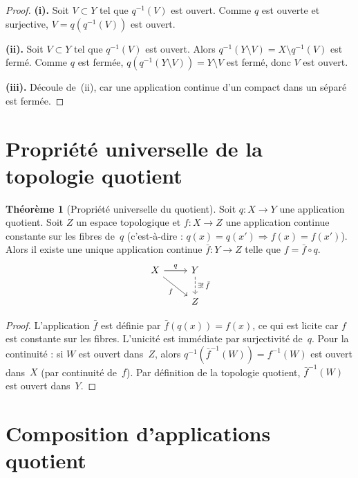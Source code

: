 \documentclass[12pt,a4paper,openany]{book}
\theoremstyle{definition}
\theoremstyle{cours}
\newtheorem{theoreme}{Théorème}[chapter]
\theoremstyle{coursnormal}
\begin{document}
\begin{proof}
\noindent\textbf{(i).} Soit $V \subset Y$ tel que $q^{-1}(V)$ est ouvert. Comme $q$ est
ouverte et surjective, $V = q(q^{-1}(V))$ est ouvert.

\noindent\textbf{(ii).} Soit $V \subset Y$ tel que $q^{-1}(V)$ est ouvert. Alors
$q^{-1}(Y \setminus V) = X \setminus q^{-1}(V)$ est fermé. Comme $q$ est fermée,
$q(q^{-1}(Y \setminus V)) = Y \setminus V$ est fermé, donc $V$ est ouvert.

\noindent\textbf{(iii).} Découle de~(ii), car une application continue d'un
compact dans un séparé est fermée.
\end{proof}

\section{Propriété universelle de la topologie quotient}
\label{sec:propriete-universelle-quotient}

\begin{theoreme}[Propriété universelle du quotient]
\label{thm:universelle-quotient}
Soit $q \colon X \to Y$ une application quotient. Soit $Z$ un espace topologique
et $f \colon X \to Z$ une application continue constante sur les fibres de~$q$
(c'est-à-dire : $q(x) = q(x') \Rightarrow f(x) = f(x')$). Alors il existe une unique
application continue $\bar{f} \colon Y \to Z$ telle que $f = \bar{f} \circ q$.
\[
\begin{tikzcd}
  X \arrow[r, "q"] \arrow[dr, "f"'] & Y \arrow[d, dashed, "\exists!\, \bar{f}"] \\
  & Z
\end{tikzcd}
\]
\end{theoreme}

\begin{proof}
L'application $\bar{f}$ est définie par $\bar{f}(q(x)) = f(x)$, ce qui est licite
car $f$ est constante sur les fibres. L'unicité est immédiate par surjectivité de~$q$.
Pour la continuité : si $W$ est ouvert dans~$Z$, alors
$q^{-1}(\bar{f}^{-1}(W)) = f^{-1}(W)$ est ouvert dans~$X$ (par continuité de~$f$).
Par définition de la topologie quotient, $\bar{f}^{-1}(W)$ est ouvert dans~$Y$.
\end{proof}

\section{Composition d'applications quotient}
\label{sec:composition-quotient}
\end{document}
